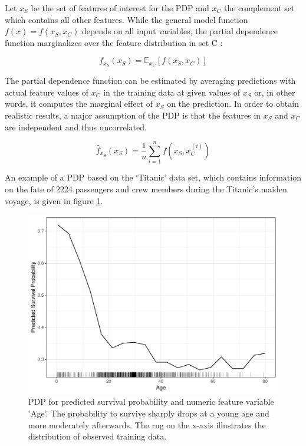 \documentclass[]{krantz}
\begin{document}
Let \(x_S\) be the set of features of interest for the PDP and \(x_C\)
the complement set which contains all other features. While the general
model function \(f(x) = f(x_S, x_C)\) depends on all input variables,
the partial dependence function marginalizes over the feature
distribution in set C \citep{hastie2013elements}:

\[f_{x_S}(x_S) = \mathbb{E}_{x_C}[f(x_S, x_C)]\]

The partial dependence function can be estimated by averaging
predictions with actual feature values of \(x_C\) in the training data
at given values of \(x_S\) or, in other words, it computes the marginal
effect of \(x_S\) on the prediction. In order to obtain realistic
results, a major assumption of the PDP is that the features in \(x_S\)
and \(x_C\) are independent and thus
uncorrelated.\citep{hastie2013elements}

\[\hat{f}_{x_S}(x_S)=\frac{1}{n}\sum_{i=1}^{n}f(x_S, x^{(i)}_{C})\]

An example of a PDP based on the `Titanic' data set, which contains
information on the fate of 2224 passengers and crew members during the
Titanic's maiden voyage, is given in figure \ref{fig:plot1}.

\begin{figure}

{\centering \includegraphics[width=0.8\linewidth]{images/PDP_Plot_1} 

}

\caption{PDP for predicted survival probability and numeric feature variable 'Age'. The probability to survive sharply drops at a young age and more moderately afterwards. The rug on the x-axis illustrates the distribution of observed training data.}\label{fig:plot1}
\end{figure}
\end{document}
